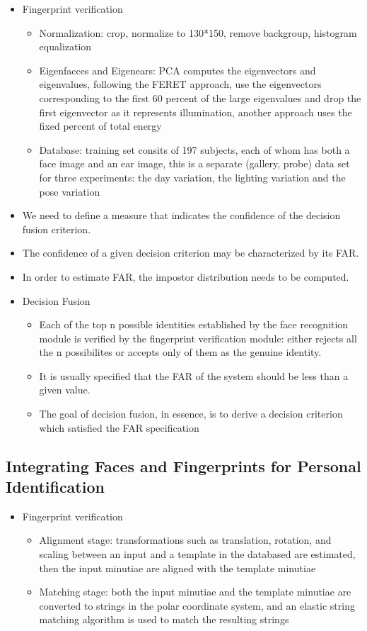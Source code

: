 \documentclass[paper=a4, fontsize=11pt]{scrartcl} %
\numberwithin{equation}{section} %
\numberwithin{figure}{section} %
\numberwithin{table}{section} %
\begin{document}
\begin{itemize}
\item Fingerprint verification
\begin{itemize}
\item Normalization: crop, normalize to 130*150, remove backgroup, histogram equalization
\item Eigenfacces and Eigenears: PCA computes the eigenvectors and eigenvalues, following the FERET approach, use the eigenvectors corresponding to the first 60 percent of the large eigenvalues and drop the first eigenvector as it represents illumination, another approach uses the fixed percent of total energy
\item Database: training set consits of 197 subjects, each of whom has both a face image and an ear image, this is a separate (gallery, probe) data set for three experiments: the day variation, the lighting variation and the pose variation
\end{itemize}
\item We need to define a measure that indicates the confidence of the decision fusion criterion.
\item The confidence of a given decision criterion may be characterized by its FAR.
\item In order to estimate FAR, the impostor distribution needs to be computed.
\item Decision Fusion
\begin{itemize}
\item Each of the top n possible identities established by the face recognition module is verified by the fingerprint verification module: either rejects all the n possibilites or accepts only of them as the genuine identity.
\item It is usually specified that the FAR of the system should be less than a given value.
\item The goal of decision fusion, in essence, is to derive a decision criterion which satisfied the FAR specification
\end{itemize}
\end{itemize}

\subsection{Integrating Faces and Fingerprints for Personal Identification}

\begin{itemize}
\item Fingerprint verification
\begin{itemize}
\item Alignment stage: transformations such as translation, rotation, and scaling between an input and a template in the databased are estimated, then the input minutiae are aligned with the template minutiae
\item Matching stage: both the input minutiae and the template minutiae are converted to strings in the polar coordinate system, and an elastic string matching algorithm is used to match the resulting strings
\end{itemize}
\end{itemize}
\end{document}
